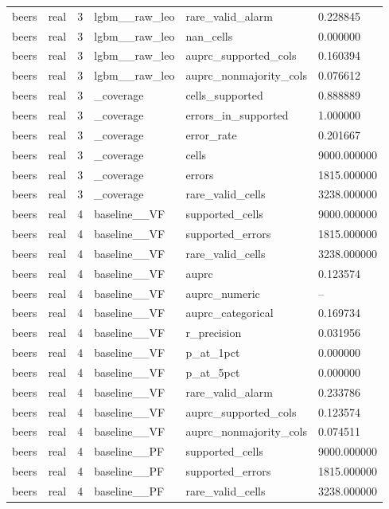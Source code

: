 \begin{tabular}{llllll}
beers & real & 3 & lgbm\_\_raw\_leo & rare\_valid\_alarm & 0.228845 \\
beers & real & 3 & lgbm\_\_raw\_leo & nan\_cells & 0.000000 \\
beers & real & 3 & lgbm\_\_raw\_leo & auprc\_supported\_cols & 0.160394 \\
beers & real & 3 & lgbm\_\_raw\_leo & auprc\_nonmajority\_cols & 0.076612 \\
beers & real & 3 & \_coverage & cells\_supported & 0.888889 \\
beers & real & 3 & \_coverage & errors\_in\_supported & 1.000000 \\
beers & real & 3 & \_coverage & error\_rate & 0.201667 \\
beers & real & 3 & \_coverage & cells & 9000.000000 \\
beers & real & 3 & \_coverage & errors & 1815.000000 \\
beers & real & 3 & \_coverage & rare\_valid\_cells & 3238.000000 \\
beers & real & 4 & baseline\_\_VF & supported\_cells & 9000.000000 \\
beers & real & 4 & baseline\_\_VF & supported\_errors & 1815.000000 \\
beers & real & 4 & baseline\_\_VF & rare\_valid\_cells & 3238.000000 \\
beers & real & 4 & baseline\_\_VF & auprc & 0.123574 \\
beers & real & 4 & baseline\_\_VF & auprc\_numeric & -- \\
beers & real & 4 & baseline\_\_VF & auprc\_categorical & 0.169734 \\
beers & real & 4 & baseline\_\_VF & r\_precision & 0.031956 \\
beers & real & 4 & baseline\_\_VF & p\_at\_1pct & 0.000000 \\
beers & real & 4 & baseline\_\_VF & p\_at\_5pct & 0.000000 \\
beers & real & 4 & baseline\_\_VF & rare\_valid\_alarm & 0.233786 \\
beers & real & 4 & baseline\_\_VF & auprc\_supported\_cols & 0.123574 \\
beers & real & 4 & baseline\_\_VF & auprc\_nonmajority\_cols & 0.074511 \\
beers & real & 4 & baseline\_\_PF & supported\_cells & 9000.000000 \\
beers & real & 4 & baseline\_\_PF & supported\_errors & 1815.000000 \\
beers & real & 4 & baseline\_\_PF & rare\_valid\_cells & 3238.000000 \\

\end{tabular}
